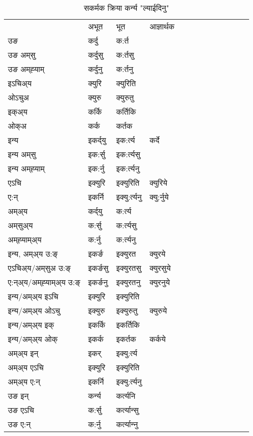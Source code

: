\begin{table}[H]
\centering
\caption{\label{urt.vt} सकर्मक क्रिया  कर्न्य  "ल्याईदिनु"  }
\begin{tabular}{l|l|l|l|l|l|l|l|l|l|l|l|l}  \toprule
&अभूत & भूत & आज्ञार्थक \\ 
उङ &कर्दु &क:र्त \\ 
उङ अम्‌सु&कर्दुसु &क:र्तसु \\ 
उङ अम्‌ह्‍याम्&कर्दुनु &क:र्तनु \\ 
इऽचिअ्य &क्युरि &क्युरिति   \\ 
ओऽचुअ        &क्युरु &क्युरुतु   \\ 
इक्अ्य&कर्कि &कर्तिकि   \\ 
ओक्अ &कर्क &कर्तक   \\ 
इन्य & इकर्द्‌यु  & इक:र्त्य &कर्दे  \\ 
इन्य अम्‌सु& इक:र्सु  & इक:र्त्यसु   \\ 
इन्य अम्‌ह्‍याम्& इक:र्नु  & इक:र्त्यनु   \\ 
एऽचि & इक्युरि & इक्युरिति &क्युरिये    \\ 
ए:न् & इकर्नि  & इक्यु:र्त्यनु &क्यु:र्नुये  \\ 
अम्अ्य & कर्द्‌यु  & क:र्त्य  \\ 
अम्‌सुअ्य & क:र्सु & क:र्त्यसु  \\ 
अम्‌ह्‍याम्अ्य & क:र्नु  & क:र्त्यनु \\ 
\midrule
इन्य, अम्अ्य उ:ङ्‌ &इकर्ङ &इक्युरत &क्युरये \\ 
एऽचिअ्य/अम्‌सुअ उ:ङ्‌ &इकर्ङसु &इक्युरतसु &क्युरसुये \\ 
ए:न्अ्य/अम्‌ह्‍याम्अ्य उ:ङ्‌ &इकर्ङनु &इक्युरतनु &क्युरनुये \\ 
इन्य/अम्अ्य इऽचि &इक्युरि &इक्युरिति    \\ 
इन्य/अम्अ्य ओऽचु &इक्युरु &इक्युरुतु  &क्युरुये  \\ 
इन्य/अम्अ्य इक् &इकर्कि &इकर्तिकि   \\ 
इन्य/अम्अ्य ओक् &इकर्क &इकर्तक  &कर्कये  \\ 
अम्अ्य इन् & इकर् & इक्यु:र्त्य   \\ 
अम्अ्य एऽचि & इक्युरि & इक्युरिति    \\ 
अम्अ्य ए:न् & इकर्नि  & इक्यु:र्त्यनु  \\ 
\midrule
उङ इन् & कर्न्य  & कर्त्यनि  \\ 
उङ एऽचि & क:र्सु  & कर्त्यान्सु   \\ 
उङ ए:न्& क:र्नु  & कर्त्यान्‍नु   \\ 
\bottomrule
\end{tabular}
\end{table}
